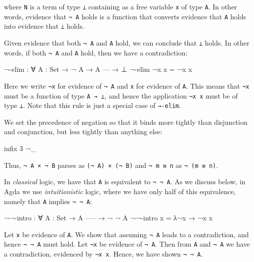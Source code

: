 where \texttt{N} is a term of type \texttt{⊥} containing as a free
variable \texttt{x} of type \texttt{A}. In other words, evidence that
\texttt{¬\ A} holds is a function that converts evidence that \texttt{A}
holds into evidence that \texttt{⊥} holds.

Given evidence that both \texttt{¬\ A} and \texttt{A} hold, we can
conclude that \texttt{⊥} holds. In other words, if both \texttt{¬\ A}
and \texttt{A} hold, then we have a contradiction:

\begin{fence}
\begin{code}
¬-elim : ∀ {A : Set}
  → ¬ A
  → A
    ---
  → ⊥
¬-elim ¬x x = ¬x x
\end{code}
\end{fence}

Here we write \texttt{¬x} for evidence of \texttt{¬\ A} and \texttt{x}
for evidence of \texttt{A}. This means that \texttt{¬x} must be a
function of type \texttt{A\ →\ ⊥}, and hence the application
\texttt{¬x\ x} must be of type \texttt{⊥}. Note that this rule is just a
special case of \texttt{→-elim}.

We set the precedence of negation so that it binds more tightly than
disjunction and conjunction, but less tightly than anything else:

\begin{fence}
\begin{code}
infix 3 ¬_
\end{code}
\end{fence}

Thus, \texttt{¬\ A\ ×\ ¬\ B} parses as \texttt{(¬\ A)\ ×\ (¬\ B)} and
\texttt{¬\ m\ ≡\ n} as \texttt{¬\ (m\ ≡\ n)}.

In \emph{classical} logic, we have that \texttt{A} is equivalent to
\texttt{¬\ ¬\ A}. As we discuss below, in Agda we use
\emph{intuitionistic} logic, where we have only half of this
equivalence, namely that \texttt{A} implies \texttt{¬\ ¬\ A}:

\begin{fence}
\begin{code}
¬¬-intro : ∀ {A : Set}
  → A
    -----
  → ¬ ¬ A
¬¬-intro x  =  λ{¬x → ¬x x}
\end{code}
\end{fence}

Let \texttt{x} be evidence of \texttt{A}. We show that assuming
\texttt{¬\ A} leads to a contradiction, and hence \texttt{¬\ ¬\ A} must
hold. Let \texttt{¬x} be evidence of \texttt{¬\ A}. Then from \texttt{A}
and \texttt{¬\ A} we have a contradiction, evidenced by \texttt{¬x\ x}.
Hence, we have shown \texttt{¬\ ¬\ A}.


